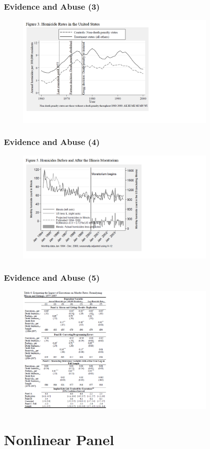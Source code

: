 \documentclass{beamer}
\newcommand{\1}{\mathbb{1}}
\begin{document}
\begin{frame}\frametitle{Evidence and Abuse (3)}
\begin{figure}
\includegraphics[width = 10cm]{plot/Nondeath}
\end{figure}
\end{frame}

\begin{frame}\frametitle{Evidence and Abuse (4)}
\begin{figure}
\includegraphics[width = 10cm]{plot/Illinois}
\end{figure}
\end{frame}

\begin{frame}\frametitle{Evidence and Abuse (5)}
\begin{figure}
\includegraphics[width = 10cm]{plot/Table}
\end{figure}
\end{frame}


\section{Nonlinear Panel}

\begin{frame}\frametitle{}
\end{frame}

\begin{frame}\frametitle{}
\end{frame}

\begin{frame}\frametitle{}
\end{frame}

\begin{frame}\frametitle{}
\end{frame}
\end{document}
